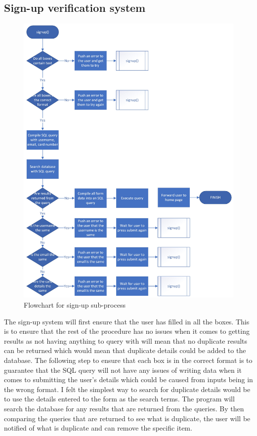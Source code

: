 \subsection{Sign-up verification system}
\begin{figure}[H]
    \centering
    \includegraphics[scale=0.3]{ch2_design/c3_signup_2.jpeg}
    \caption{Flowchart for sign-up sub-process}
    \label{fig:flow_signup}
\end{figure}
 The sign-up system will first ensure that the user has filled in all the boxes. This is to ensure that the rest of the procedure has no issues when it comes to getting results as not having anything to query with will mean that no duplicate results can be returned which would mean that duplicate details could be added to the database. The following step to ensure that each box is in the correct format is to guarantee that the SQL query will not have any issues of writing data when it comes to submitting the user’s details which could be caused from inputs being in the wrong format. I felt the simplest way to search for duplicate details would be to use the details entered to the form as the search terms. The program will search the database for any results that are returned from the queries. By then comparing the queries that are returned to see what is duplicate, the user will be notified of what is duplicate and can remove the specific item.


